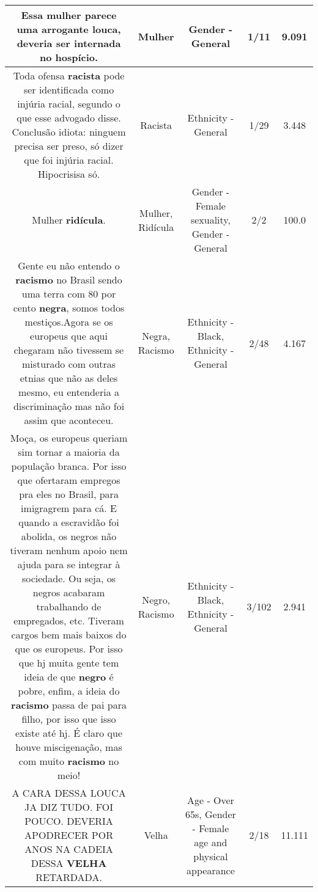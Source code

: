 \documentclass[11pt]{article}
\newlength\mylength
\begin{document}
\begin{center}
\begin{longtable}{|C{.65\mylength}|C{.30\mylength}|C{.12\mylength}|C{.12\mylength}|C{.12\mylength}|}
  \small Essa \textbf{mulher} parece uma arrogante louca, deveria ser internada no hospício.\normalsize   & Mulher & Gender - General & 1/11 & 9.091 \\  \hline
  \small Toda ofensa \textbf{racista} pode ser identificada como injúria racial, segundo o que esse advogado disse. Conclusão idiota: ninguem precisa ser preso, só dizer que foi injúria racial. Hipocrisisa só.\normalsize   & Racista & Ethnicity - General & 1/29 & 3.448 \\  \hline
  \small Mulher \textbf{ridícula}.\normalsize   & Mulher, Ridícula & Gender - Female sexuality, Gender - General & 2/2 & 100.0 \\  \hline
  \small Gente eu não entendo o \textbf{racismo} no Brasil sendo uma terra com 80 por cento \textbf{negra}, somos todos mestiços.Agora se os europeus que aqui chegaram não tivessem se misturado com outras etnias que não as deles  mesmo, eu entenderia a discriminação mas não foi assim que aconteceu.\normalsize   & Negra, Racismo & Ethnicity - Black, Ethnicity - General & 2/48 & 4.167 \\  \hline
  \small Moça, os europeus queriam sim tornar a maioria da população branca. Por isso que ofertaram empregos pra eles no Brasil, para imigragrem para cá. E quando a escravidão foi abolida, os negros não tiveram nenhum apoio nem ajuda para se integrar à sociedade. Ou seja, os negros acabaram trabalhando de empregados, etc. Tiveram cargos bem mais baixos do que os europeus. Por isso que  hj muita gente tem ideia de que \textbf{negro} é pobre, enfim, a ideia do \textbf{racismo} passa de pai para filho, por isso que isso existe até hj. É claro que houve miscigenação, mas com muito \textbf{racismo} no meio!\normalsize   & Negro, Racismo & Ethnicity - Black, Ethnicity - General & 3/102 & 2.941 \\  \hline
  \small A CARA DESSA LOUCA JA DIZ TUDO. FOI POUCO. DEVERIA APODRECER POR ANOS NA CADEIA DESSA \textbf{V\textbf{ELHA}} RETARDADA.\normalsize   & Velha & Age - Over 65s, Gender - Female age and physical appearance & 2/18 & 11.111 \\  \hline

\end{longtable}
\end{center}
\end{document}
